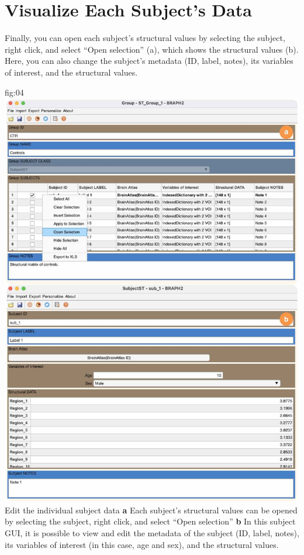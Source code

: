\documentclass[justified]{tufte-handout}
\begin{document}
\section{Visualize Each Subject's Data}

Finally, you can open each subject's structural values by selecting the subject, right click, and select ``Open selection'' (a), which shows the structural values (b). Here, you can also change the subject's metadata (ID, label, notes), its variables of interest, and the structural values.

	{fig:04}
	{\includegraphics{fig04.jpg}
	}
	{Edit the individual subject data}
	{
	{\bf a}  Each subject's structural values can be opened by selecting the subject, right click, and select ``Open selection''
	{\bf b} In this subject GUI, it is possible to view and edit the metadata of the subject (ID, label, notes), its variables of interest (in this case, age and sex), and the structural values. 
	}
\end{document}
